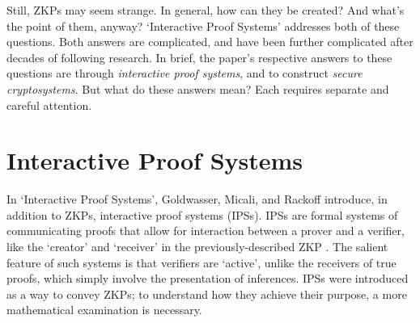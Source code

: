 \documentclass{article}
\begin{document}
Still, ZKPs may seem strange. In general, how can they be created? And what's the point of them, anyway? `Interactive Proof Systems' addresses both of these questions. Both answers are complicated, and have been further complicated after decades of following research. In brief, the paper's respective answers to these questions are through \textit{interactive proof systems}, and to construct \textit{secure cryptosystems}. But what do these answers mean? Each requires separate and careful attention.


\section{Interactive Proof Systems}

In `Interactive Proof Systems', Goldwasser, Micali, and Rackoff introduce, in addition to ZKPs, interactive proof systems (IPSs). IPSs are formal systems of communicating proofs that allow for interaction between a prover and a verifier, like the `creator' and `receiver' in the previously-described ZKP \cite{GMR}. The salient feature of such systems is that verifiers are `active', unlike the receivers of true proofs, which simply involve the presentation of inferences. IPSs were introduced as a way to convey ZKPs; to understand how they achieve their purpose, a more mathematical examination is necessary.
\end{document}
